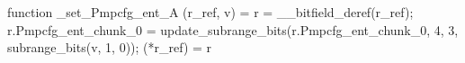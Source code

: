 function _set_Pmpcfg_ent_A (r_ref, v) = {
    r = __bitfield_deref(r_ref);
    r.Pmpcfg_ent_chunk_0 = update_subrange_bits(r.Pmpcfg_ent_chunk_0, 4, 3, subrange_bits(v, 1, 0));
    (*r_ref) = r
}
